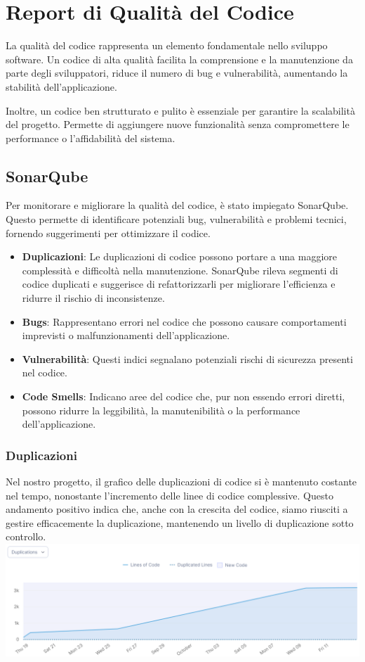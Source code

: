 \chapter{Report di Qualità del Codice}
La qualità del codice rappresenta un elemento fondamentale nello sviluppo software.
Un codice di alta qualità facilita la comprensione e la manutenzione da parte degli sviluppatori, riduce il numero di bug e vulnerabilità, aumentando la stabilità dell'applicazione.\par
Inoltre, un codice ben strutturato e pulito è essenziale per garantire la scalabilità del progetto. Permette di aggiungere nuove funzionalità senza compromettere le performance o l'affidabilità del sistema.

\section{SonarQube}
Per monitorare e migliorare la qualità del codice, è stato impiegato SonarQube. Questo permette di identificare potenziali bug, vulnerabilità e problemi tecnici, fornendo suggerimenti per ottimizzare il codice.
\begin{itemize}
    \item \textbf{Duplicazioni}: Le duplicazioni di codice possono portare a una maggiore complessità e difficoltà nella manutenzione. SonarQube rileva segmenti di codice duplicati e suggerisce di refattorizzarli per migliorare l'efficienza e ridurre il rischio di inconsistenze.

    \item \textbf{Bugs}: Rappresentano errori nel codice che possono causare comportamenti imprevisti o malfunzionamenti dell'applicazione.

    \item \textbf{Vulnerabilità}: Questi indici segnalano potenziali rischi di sicurezza presenti nel codice.
    
    \item \textbf{Code Smells}: Indicano aree del codice che, pur non essendo errori diretti, possono ridurre la leggibilità, la manutenibilità o la performance dell'applicazione.
\end{itemize}
\pagebreak
\subsection*{Duplicazioni}
Nel nostro progetto, il grafico delle duplicazioni di codice si è mantenuto costante nel tempo, nonostante l'incremento delle linee di codice complessive. Questo andamento positivo indica che, anche con la crescita del codice, siamo riusciti a gestire efficacemente la duplicazione, mantenendo un livello di duplicazione sotto controllo.\meskip
\includegraphics[width=\textwidth]{assets/sonarqube/duplication.png}


